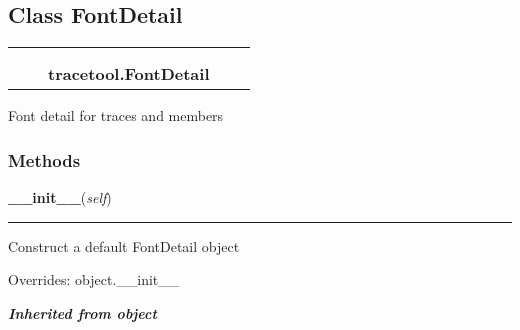 

\subsection{Class FontDetail}

    \label{tracetool:FontDetail}
\begin{tabular}{cccccc}
\multicolumn{2}{r}{\settowidth{\BCL}{object}\multirow{2}{\BCL}{object}}
&&
  \\\cline{3-3}
  &&\multicolumn{1}{c|}{}
&&
  \\
&&\multicolumn{2}{l}{\textbf{tracetool.FontDetail}}
\end{tabular}

Font detail for traces and members



  \subsubsection{Methods}

    \vspace{0.5ex}

\hspace{.8\funcindent}\begin{boxedminipage}{\funcwidth}

    \raggedright \textbf{\_\_init\_\_}(\textit{self})

    \vspace{-1.5ex}

    \rule{\textwidth}{0.5\fboxrule}
\setlength{\parskip}{2ex}
    Construct a default FontDetail object

\setlength{\parskip}{1ex}
      Overrides: object.\_\_init\_\_

    \end{boxedminipage}


\large{\textbf{\textit{Inherited from object}}}

